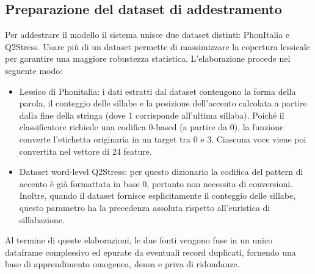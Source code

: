 \subsection{Preparazione del dataset di addestramento}
Per addestrare il modello il sistema unisce due dataset distinti: PhonItalia e Q2Stress. Usare più di un dataset permette di massimizzare la copertura 
lessicale per garantire una maggiore robustezza statistica. L'elaborazione procede nel seguente modo:
\begin{itemize}
      \item Lessico di Phonitalia: i dati estratti dal dataset contengono la forma della parola, il conteggio delle sillabe e la posizione dell'accento 
      calcolata a partire dalla fine della stringa (dove 1 corrisponde all'ultima sillaba). Poiché il classificatore richiede una codifica 0-based 
      (a partire da 0), la funzione converte l'etichetta originaria in un target tra 0 e 3. Ciascuna voce viene poi convertita nel vettore di 24 feature.
      \item Dataset word-level Q2Stress: per questo dizionario la codifica del pattern di accento è già formattata in base 0, pertanto non necessita 
      di conversioni. Inoltre, quando il dataset fornisce esplicitamente il conteggio delle sillabe, questo parametro ha la precedenza assoluta rispetto 
      all'euristica di sillabazione.
\end{itemize}
Al termine di queste elaborazioni, le due fonti vengono fuse in un unico dataframe complessivo ed epurate da eventuali record duplicati, fornendo una base 
di apprendimento omogenea, densa e priva di ridondanze.

